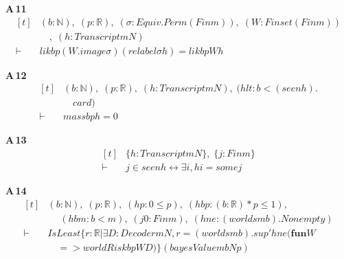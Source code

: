 \noindent\textbf{A\,11}\quad{}
{\footnotesize\[ \begin{aligned}[t]
&(\mathit{b} : \mathbb{N} ),\; (\mathit{p} : \mathbb{R} ),\; (\sigma : \mathit{Equiv}.\mathit{Perm} (\mathit{Fin} \mathit{m})),\; (\mathit{W} : \mathit{Finset} (\mathit{Fin} \mathit{m}))\\
&\quad ,\; (\mathit{h} : \mathit{Transcript} \mathit{m} \mathit{N})\\
\vdash\;&\mathit{lik} \mathit{b} \mathit{p} (\mathit{W}.\mathit{image} \sigma ) (\mathit{relabel} \sigma \mathit{h}) = \mathit{lik} \mathit{b} \mathit{p} \mathit{W} \mathit{h}
\end{aligned} \]}

\noindent\textbf{A\,12}\quad{}
{\footnotesize\[ \begin{aligned}[t]
&(\mathit{b} : \mathbb{N} ),\; (\mathit{p} : \mathbb{R} ),\; (\mathit{h} : \mathit{Transcript} \mathit{m} \mathit{N}),\; (\mathit{hlt} : \mathit{b} < (\mathit{seen} \mathit{h}).\\
&\quad \mathit{card})\\
\vdash\;&\mathit{mass} \mathit{b} \mathit{p} \mathit{h} = 0
\end{aligned} \]}

\noindent\textbf{A\,13}\quad{}
{\footnotesize\[ \begin{aligned}[t]
&\{ \mathit{h} : \mathit{Transcript} \mathit{m} \mathit{N}\},\; \{ \mathit{j} : \mathit{Fin} \mathit{m}\}\\
\vdash\;&\mathit{j} \in \mathit{seen} \mathit{h} \leftrightarrow \exists \mathit{i}, \mathit{h} \mathit{i} = \mathit{some} \mathit{j}
\end{aligned} \]}

\noindent\textbf{A\,14}\quad{}
{\footnotesize\[ \begin{aligned}[t]
&(\mathit{b} : \mathbb{N} ),\; (\mathit{p} : \mathbb{R} ),\; (\mathit{hp} : 0 \leq \mathit{p}),\; (\mathit{hbp} : (\mathit{b} : \mathbb{R} ) * \mathit{p} \leq 1),\\
&\quad \; (\mathit{hbm} : \mathit{b} < \mathit{m}),\; (\mathit{j0} : \mathit{Fin} \mathit{m}),\; (\mathit{hne} : (\mathit{worlds} \mathit{m} \mathit{b}).\mathit{Nonempty})\\
\vdash\;&\mathit{IsLeast} \{ \mathit{r} : \mathbb{R} | \exists \mathit{D} : \mathit{Decoder} \mathit{m} \mathit{N}, \mathit{r} = (\mathit{worlds} \mathit{m} \mathit{b}).\mathit{sup'} \mathit{hne} (\mathbf{fun} \mathit{W}\\
&\quad => \mathit{worldRisk} \mathit{b} \mathit{p} \mathit{W} \mathit{D})\} (\mathit{bayesValue} \mathit{m} \mathit{b} \mathit{N} \mathit{p})
\end{aligned} \]}

